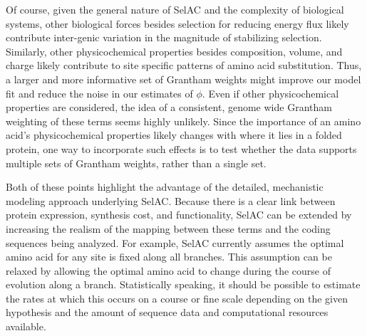 \documentclass{article}
\newcommand{\selac}{SelAC\xspace}
\begin{document}
Of course, given the general nature of \selac and the complexity of biological systems, other biological forces besides selection for reducing energy flux likely contribute inter-genic variation in the magnitude of stabilizing selection.
Similarly, other physicochemical properties besides composition, volume, and charge likely contribute to site specific patterns of amino acid substitution.
Thus, a larger and more informative set of Grantham weights might improve our model fit and reduce the noise in our estimates of $\phi$.
Even if other physicochemical properties are considered, the idea of a consistent, genome wide Grantham weighting of these terms seems highly unlikely.
Since the importance of an amino acid's physicochemical properties likely changes with where it lies in a folded protein, one way to incorporate such effects is to test whether the data supports multiple sets of Grantham weights, rather than a single set.

Both of these points highlight the advantage of the detailed, mechanistic modeling approach underlying \selac.
Because there is a clear link between protein expression, synthesis cost, and functionality, \selac can be extended by increasing the realism of the mapping between these terms and the coding sequences being analyzed.
For example, \selac currently assumes the optimal amino acid for any site is fixed along all branches.
This assumption can be relaxed by allowing the optimal amino acid to change during the course of evolution along a branch.
Statistically speaking, it should be possible to estimate the rates at which this occurs on a course or fine scale depending on the given hypothesis and the amount of sequence data and computational resources available.

\end{document}
